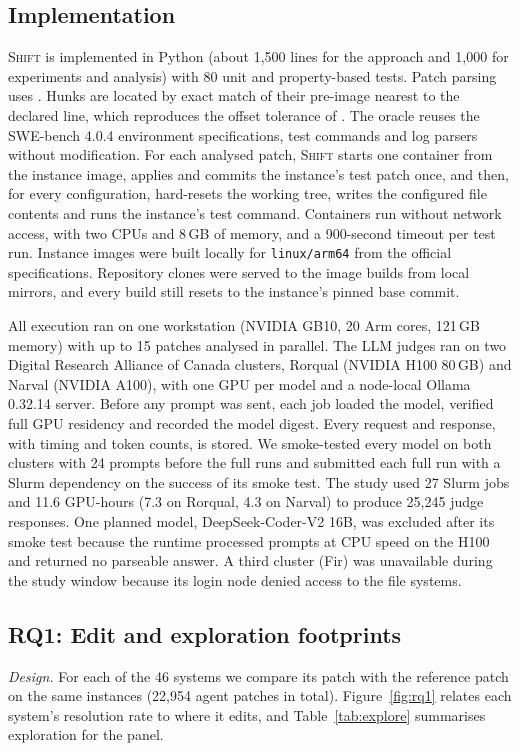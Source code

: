 \documentclass[a4paper,fleqn]{cas-sc}
\newcommand{\tool}{\textsc{Shift}}
\newcommand{\code}[1]{\texttt{\detokenize{#1}}}
\newcommand{\nGpuHours}{11.6}
\newcommand{\nGpuHoursNarval}{4.3}
\newcommand{\nGpuHoursRorqual}{7.3}
\newcommand{\nGpuJobs}{27}
\newcommand{\nLlmGenerations}{25{,}245}
\newcommand{\rqonePatches}{22{,}954}
\newcommand{\rqoneSystems}{46}
\begin{document}
\subsection{Implementation}\label{sec:impl}
\tool{} is implemented in Python (about 1{,}500 lines for the approach and 1{,}000 for experiments and analysis) with 80 unit and property-based tests. Patch parsing uses \code{unidiff}. Hunks are located by exact match of their pre-image nearest to the declared line, which reproduces the offset tolerance of \code{git apply}. The oracle reuses the SWE-bench 4.0.4 environment specifications, test commands and log parsers without modification. For each analysed patch, \tool{} starts one container from the instance image, applies and commits the instance's test patch once, and then, for every configuration, hard-resets the working tree, writes the configured file contents and runs the instance's test command. Containers run without network access, with two CPUs and 8\,GB of memory, and a 900-second timeout per test run. Instance images were built locally for \texttt{linux/arm64} from the official specifications. Repository clones were served to the image builds from local mirrors, and every build still resets to the instance's pinned base commit.

All execution ran on one workstation (NVIDIA GB10, 20 Arm cores, 121\,GB memory) with up to 15 patches analysed in parallel. The LLM judges ran on two Digital Research Alliance of Canada clusters, Rorqual (NVIDIA H100 80\,GB) and Narval (NVIDIA A100), with one GPU per model and a node-local Ollama 0.32.14 server. Before any prompt was sent, each job loaded the model, verified full GPU residency and recorded the model digest. Every request and response, with timing and token counts, is stored. We smoke-tested every model on both clusters with 24 prompts before the full runs and submitted each full run with a Slurm dependency on the success of its smoke test. The study used \nGpuJobs{} Slurm jobs and \nGpuHours{} GPU-hours (\nGpuHoursRorqual{} on Rorqual, \nGpuHoursNarval{} on Narval) to produce \nLlmGenerations{} judge responses. One planned model, DeepSeek-Coder-V2 16B, was excluded after its smoke test because the runtime processed prompts at CPU speed on the H100 and returned no parseable answer. A third cluster (Fir) was unavailable during the study window because its login node denied access to the file systems.

\subsection{RQ1: Edit and exploration footprints}\label{sec:rq1}
\emph{Design.} For each of the \rqoneSystems{} systems we compare its patch with the reference patch on the same instances (\rqonePatches{} agent patches in total). Figure~\ref{fig:rq1} relates each system's resolution rate to where it edits, and Table~\ref{tab:explore} summarises exploration for the panel.
\end{document}
